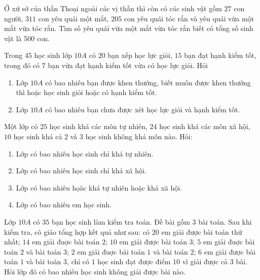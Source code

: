 \begin{bt}%
	Ở xứ sở của thần Thoại ngoài các vị thần thì còn có các sinh vật gồm $27$ con người, $311$ con yêu quái một mắt, $205$ con yêu quái tóc rắn và yêu quái vừa một mắt vừa tóc rắn. Tìm số yêu quái vừa một mắt vừa tóc rắn biết có tổng số sinh vật là 500 con.
\end{bt}
\begin{bt}%
	Trong $45$ học sinh lớp $10A$ có $20$ bạn xếp học lực giỏi, $15$ bạn đạt hạnh kiểm tốt, trong đó có $7$ bạn vừa đạt hạnh kiểm tốt vừa có học lực giỏi. Hỏi
	\begin{enumerate}
		\item Lớp $10A$ có bao nhiêu bạn được khen thưởng, biết muốn được khen thưởng thì hoặc học sinh giỏi hoặc có hạnh kiểm tốt.
		\item Lớp $10A$ có bao nhiêu bạn chưa được xét học lực giỏi và hạnh kiểm tốt.
	\end{enumerate}
\end{bt}
\begin{bt}%
	Một lớp có $25$ học sinh khá các môn tự nhiên, $24$ học sinh khá các môn xã hội, $10$ học sinh khá cả $2$ và $3$ học sinh không khá môn nào. Hỏi:
	\begin{enumerate}
		\item Lớp có bao nhiêu học sinh chỉ khá tự nhiên.
		\item Lớp có bao nhiêu học sinh chỉ khá xã hội.
		\item Lớp có bao nhiêu họăc khá tự nhiên hoặc khá xã hội.
		\item Lớp có bao nhiêu em học sinh.
	\end{enumerate}
\end{bt}

\begin{bt}%
	Lớp $10A$ có $35$ bạn học sinh làm kiểm tra toán. Đề bài gồm $3$ bài toán. Sau khi kiểm tra, cô giáo tổng hợp kết quả như sau: có $20$ em giải được bài toán thứ nhất; $14$ em giải đuợc bài toán $2$; $10$ em giải được bài toán $3$; $5$ em giải đuợc bài toán $2$ và bài toán $3$; $2$ em giải đuợc bài toán $1$ và bài toán $2$; $6$ em giải được bài toán $1$ và bài toán $3$, chỉ có $1$ học sinh đạt được điểm $10$ vì giải được cả $3$ bài. Hỏi lớp đó có bao nhiêu học sinh không giải được bài nào.
\end{bt}


